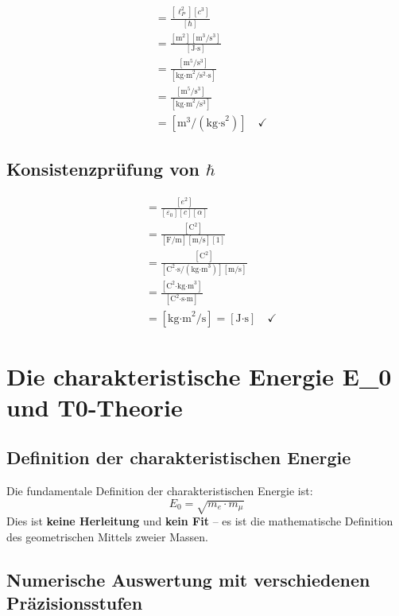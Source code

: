 \documentclass[12pt,a4paper]{article}
\theoremstyle{definition}
\begin{document}
	\begin{align}
		[G] &= \frac{[\ell_P^2][c^3]}{[\hbar]}\\
		&= \frac{[\text{m}^2][\text{m}^3/\text{s}^3]}{[\text{J·s}]}\\
		&= \frac{[\text{m}^5/\text{s}^3]}{[\text{kg·m}^2/\text{s}^2\text{·s}]}\\
		&= \frac{[\text{m}^5/\text{s}^3]}{[\text{kg·m}^2/\text{s}^3]}\\
		&= [\text{m}^3/(\text{kg·s}^2)] \quad \checkmark
	\end{align}
	
	\subsection{Konsistenzpr\"ufung von $\hbar$}
	
	\begin{align}
		[\hbar] &= \frac{[e^2]}{[\varepsilon_0][c][\alpha]}\\
		&= \frac{[\text{C}^2]}{[\text{F/m}][\text{m/s}][1]}\\
		&= \frac{[\text{C}^2]}{[\text{C}^2\text{·s}/(\text{kg·m}^3)][\text{m/s}]}\\
		&= \frac{[\text{C}^2\text{·kg·m}^3]}{[\text{C}^2\text{·s·m}]}\\
		&= [\text{kg·m}^2/\text{s}] = [\text{J·s}] \quad \checkmark
	\end{align}
	
	\section{Die charakteristische Energie E\_0 und T0-Theorie}
	
	\subsection{Definition der charakteristischen Energie}
	
	\begin{tcolorbox}[colback=blue!5!white,colframe=blue!75!black,title=Grunddefinition]
		Die fundamentale Definition der charakteristischen Energie ist:
		\begin{equation}
			\boxed{E_0 = \sqrt{m_e \cdot m_\mu}}
		\end{equation}
		Dies ist \textbf{keine Herleitung} und \textbf{kein Fit} -- es ist die mathematische Definition des geometrischen Mittels zweier Massen.
	\end{tcolorbox}
	
	\subsection{Numerische Auswertung mit verschiedenen Pr\"azisionsstufen}
	
\end{document}
